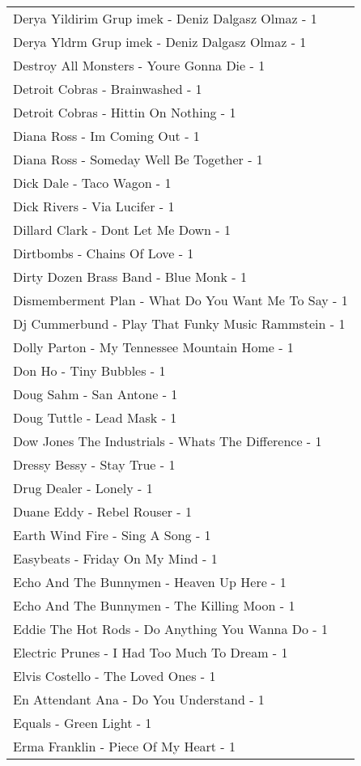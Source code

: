 \documentclass[
]{article}
\begin{document}
\begin{longtable}{l}
Derya Yildirim Grup imek - Deniz Dalgasz Olmaz - 1 \\ 
Derya Yldrm Grup imek - Deniz Dalgasz Olmaz - 1 \\ 
Destroy All Monsters - Youre Gonna Die - 1 \\ 
Detroit Cobras - Brainwashed - 1 \\ 
Detroit Cobras - Hittin On Nothing - 1 \\ 
Diana Ross - Im Coming Out - 1 \\ 
Diana Ross - Someday Well Be Together - 1 \\ 
Dick Dale - Taco Wagon - 1 \\ 
Dick Rivers - Via Lucifer - 1 \\ 
Dillard Clark - Dont Let Me Down - 1 \\ 
Dirtbombs - Chains Of Love - 1 \\ 
Dirty Dozen Brass Band - Blue Monk - 1 \\ 
Dismemberment Plan - What Do You Want Me To Say - 1 \\ 
Dj Cummerbund - Play That Funky Music Rammstein - 1 \\ 
Dolly Parton - My Tennessee Mountain Home - 1 \\ 
Don Ho - Tiny Bubbles - 1 \\ 
Doug Sahm - San Antone - 1 \\ 
Doug Tuttle - Lead Mask - 1 \\ 
Dow Jones The Industrials - Whats The Difference - 1 \\ 
Dressy Bessy - Stay True - 1 \\ 
Drug Dealer - Lonely - 1 \\ 
Duane Eddy - Rebel Rouser - 1 \\ 
Earth Wind Fire - Sing A Song - 1 \\ 
Easybeats - Friday On My Mind - 1 \\ 
Echo And The Bunnymen - Heaven Up Here - 1 \\ 
Echo And The Bunnymen - The Killing Moon - 1 \\ 
Eddie The Hot Rods - Do Anything You Wanna Do - 1 \\ 
Electric Prunes - I Had Too Much To Dream - 1 \\ 
Elvis Costello - The Loved Ones - 1 \\ 
En Attendant Ana - Do You Understand - 1 \\ 
Equals - Green Light - 1 \\ 
Erma Franklin - Piece Of My Heart - 1 \\ 

\end{longtable}
\end{document}
